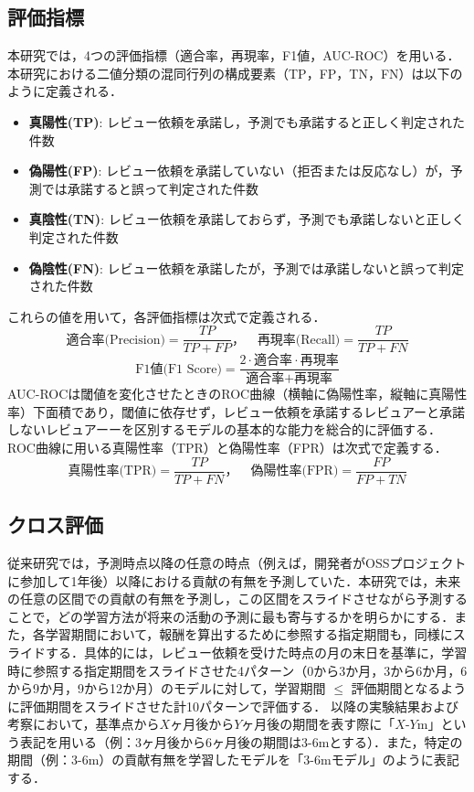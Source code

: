 \documentclass[11pt]{jreport}
\begin{document}
\subsection{評価指標}
本研究では，4つの評価指標（適合率，再現率，F1値，AUC-ROC）を用いる．
本研究における二値分類の混同行列の構成要素（TP，FP，TN，FN）は以下のように定義される．
\begin{itemize}
    \item \textbf{真陽性(TP)}: レビュー依頼を承諾し，予測でも承諾すると正しく判定された件数
    \item \textbf{偽陽性(FP)}: レビュー依頼を承諾していない（拒否または反応なし）が，予測では承諾すると誤って判定された件数
    \item \textbf{真陰性(TN)}: レビュー依頼を承諾しておらず，予測でも承諾しないと正しく判定された件数
    \item \textbf{偽陰性(FN)}: レビュー依頼を承諾したが，予測では承諾しないと誤って判定された件数
\end{itemize}

これらの値を用いて，各評価指標は次式で定義される．
\[
\text{適合率(Precision)} = \frac{TP}{TP + FP}，\quad
\text{再現率(Recall)} = \frac{TP}{TP + FN}
\]
\[
\text{F1値(F1 Score)} = \frac{2 \cdot \text{適合率} \cdot \text{再現率}}{\text{適合率} + \text{再現率}}
\]
AUC-ROCは閾値を変化させたときのROC曲線（横軸に偽陽性率，縦軸に真陽性率）下面積であり，閾値に依存せず，レビュー依頼を承諾するレビュアーと承諾しないレビュアーーを区別するモデルの基本的な能力を総合的に評価する．ROC曲線に用いる真陽性率（TPR）と偽陽性率（FPR）は次式で定義する．
\[
\text{真陽性率(TPR)} = \frac{TP}{TP + FN}，\quad
\text{偽陽性率(FPR)} = \frac{FP}{FP + TN}
\]

\subsection{クロス評価}
従来研究では，予測時点以降の任意の時点（例えば，開発者がOSSプロジェクトに参加して1年後）以降における貢献の有無を予測していた．本研究では，未来の任意の区間での貢献の有無を予測し，この区間をスライドさせながら予測することで，どの学習方法が将来の活動の予測に最も寄与するかを明らかにする．また，各学習期間において，報酬を算出するために参照する指定期間も，同様にスライドする．具体的には，レビュー依頼を受けた時点の月の末日を基準に，学習時に参照する指定期間をスライドさせた4パターン（0から3か月，3から6か月，6から9か月，9から12か月）のモデルに対して，学習期間 $\le$ 評価期間となるように評価期間をスライドさせた計10パターンで評価する．
以降の実験結果および考察において，基準点から$X$ヶ月後から$Y$ヶ月後の期間を表す際に「$X$-$Y$m」という表記を用いる（例：3ヶ月後から6ヶ月後の期間は3-6mとする）．また，特定の期間（例：3-6m）の貢献有無を学習したモデルを「3-6mモデル」のように表記する．
\end{document}
